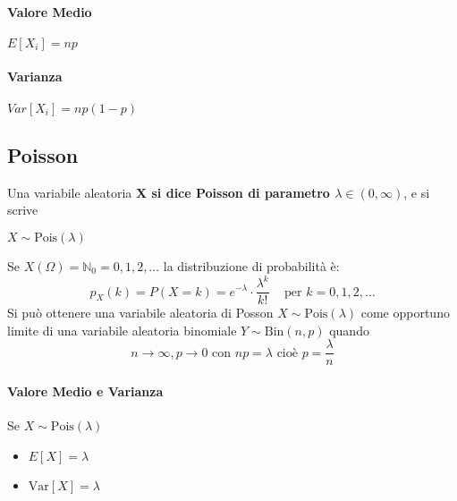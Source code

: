 \paragraph*{Valore Medio} $E[X_i] = np$ 
\paragraph*{Varianza} $Var[X_i]=np(1-p)$


\subsection{Poisson}
Una variabile aleatoria \textbf{X si dice Poisson di parametro $\lambda \in (0, \infty)$}, e si
scrive 
\begin{center}
    $X \sim \text{Pois}(\lambda)$
\end{center}
Se $X(\Omega) = \mathbb{N}_0 = {0,1,2,\dots}$ la distribuzione di probabilità è:
\[
    p_X (k) = P(X=k) = e^{-\lambda} \cdot \frac{\lambda^k}{k!} \;\;\; \text{ per } k = 0,1,2,\dots
\]
Si può ottenere una variabile aleatoria di Posson $X \sim \text{Pois}(\lambda)$ come opportuno limite
di una variabile aleatoria binomiale $Y \sim \text{Bin}(n,p)$ quando
\[
    n \rightarrow \infty, p \rightarrow 0 \text{ con } np=\lambda \text{ cioè } p = \frac{\lambda}{n}
\]
\paragraph*{Valore Medio e Varianza}
Se $X \sim \text{Pois}(\lambda)$
\begin{itemize}
    \item $E[X] = \lambda$
    \item $\text{Var}[X] = \lambda$
\end{itemize}

